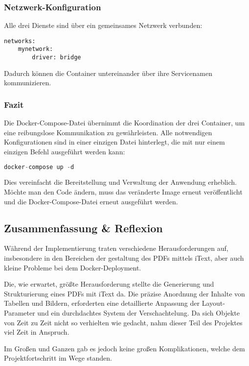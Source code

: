 	\subsubsection{Netzwerk-Konfiguration}
	\label{sec:netzwerk}
	Alle drei Dienste sind über ein gemeinsames Netzwerk verbunden:
	
	\begin{lstlisting}
networks:
	mynetwork:
    	driver: bridge
	\end{lstlisting}
	
	Dadurch können die Container untereinander über ihre Servicenamen kommunizieren.
	
	\subsubsection{Fazit}
	Die Docker-Compose-Datei übernimmt die Koordination der drei Container, um eine reibungslose Kommunikation zu gewährleisten. Alle notwendigen Konfigurationen sind in einer einzigen Datei hinterlegt, die mit nur einem einzigen Befehl ausgeführt werden kann:
	
	\begin{lstlisting}[language=Java]
docker-compose up -d
	\end{lstlisting}
	
	\noindent Dies vereinfacht die Bereitstellung und Verwaltung der Anwendung erheblich. Möchte man den Code ändern, muss das veränderte Image erneut veröffentlicht und die Docker-Compose-Datei erneut ausgeführt werden.
	
	\newpage
	\subsection{Zusammenfassung \& Reflexion}
	Während der Implementierung traten verschiedene Herausforderungen auf, insbesondere in den 
	Bereichen der gestaltung des PDFs mittels iText, aber auch kleine Probleme bei dem Docker-Deployment.
	
	\vspace{3mm}
	\noindent Die, wie erwartet, größte Herausforderung stellte die Generierung und Strukturierung eines PDFs mit iText da. 
	Die präzise Anordnung der Inhalte von Tabellen und Bildern, 
	erforderten eine detaillierte Anpassung der Layout-Parameter und ein durchdachtes System der Verschachtelung. Da sich Objekte von Zeit zu Zeit nicht so verhielten wie gedacht, nahm dieser Teil des Projektes viel Zeit in Anspruch. 
	
	\vspace{3mm}
	\noindent Im Großen und Ganzen gab es jedoch keine großen Komplikationen, welche dem Projektfortschritt im Wege standen.
	
